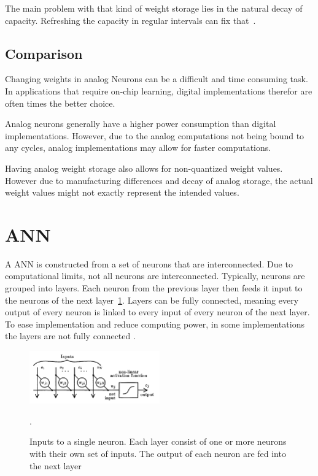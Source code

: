 \documentclass[conference]{IEEEtran}
\begin{document}
    The main problem with that kind of weight storage lies in the natural decay of capacity.
    Refreshing the capacity in regular intervals can fix that~\cite{reed1989multiple}.

    \subsection{Comparison}

    Changing weights in analog Neurons can be a difficult and time consuming task.
    In applications that require on-chip learning, digital implementations therefor are often times the better choice.

    Analog neurons generally have a higher power consumption than digital implementations.
    However, due to the analog computations not being bound to any cycles, analog implementations may allow for faster computations.

    Having analog weight storage also allows for non-quantized weight values.
    However due to manufacturing differences and decay of analog storage, the actual weight values might not exactly represent the intended values.

    \section{ANN}


    A ANN is constructed from a set of neurons that are interconnected.
    Due to computational limits, not all neurons are interconnected.
    Typically, neurons are grouped into layers.
    Each neuron from the previous layer then feeds it input to the neurons of the next layer~\ref{fig:layer}.
    Layers can be fully connected, meaning every output of every neuron is linked to every input of every neuron of the next layer.
    To ease implementation and reduce computing power, in some implementations the layers are not fully connected \cite{boser1991analog}.

    \begin{figure}[h]
        \centering
        \includegraphics[width=0.5\textwidth]{resources/network-layer.png}
        \caption{Inputs to a single neuron.
        Each layer consist of one or more neurons with their own set of inputs.
        The output of each neuron are fed into the next layer~\cite[Fig.~1]{ms1990digital}}.
        \label{fig:layer}
    \end{figure}
\end{document}
